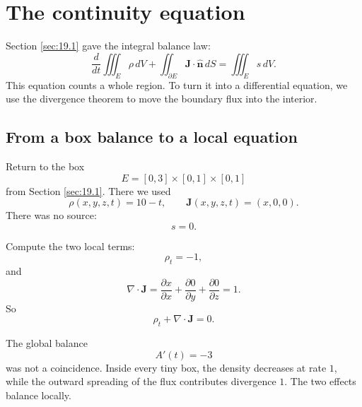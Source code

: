 \section{The continuity equation}
\label{sec:19.2}

Section \ref{sec:19.1} gave the integral balance law:
\[
    \frac{d}{dt}\iiint_E \rho\,dV
    +
    \iint_{\partial E}\mathbf J\cdot\widehat{\mathbf n}\,dS
    =
    \iiint_E s\,dV.
\]
This equation counts a whole region.  To turn it into a differential equation, we use
the divergence theorem to move the boundary flux into the interior.

\subsection{From a box balance to a local equation}

Return to the box
\[
    E=[0,3]\times[0,1]\times[0,1]
\]
from Section \ref{sec:19.1}.  There we used
\[
    \rho(x,y,z,t)=10-t,
    \qquad
    \mathbf J(x,y,z,t)=(x,0,0).
\]
There was no source:
\[
    s=0.
\]

Compute the two local terms:
\[
    \rho_t=-1,
\]
and
\[
    \nabla\cdot\mathbf J
    =
    \frac{\partial x}{\partial x}
    +
    \frac{\partial 0}{\partial y}
    +
    \frac{\partial 0}{\partial z}
    =
    1.
\]
So
\[
\boxed{
    \rho_t+\nabla\cdot\mathbf J=0.
}
\]

The global balance
\[
    A'(t)=-3
\]
was not a coincidence.  Inside every tiny box, the density decreases at rate \(1\), while
the outward spreading of the flux contributes divergence \(1\).  The two effects balance
locally.

